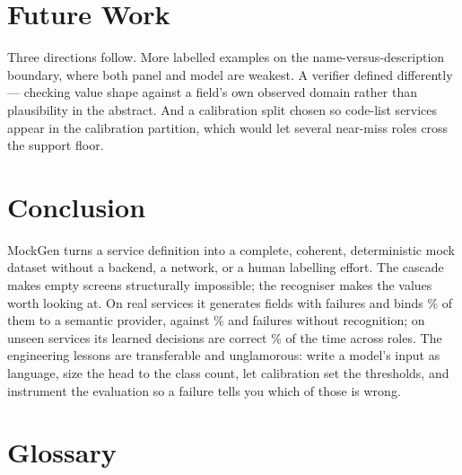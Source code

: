 \documentclass[journal]{IEEEtran}
\newcommand{\system}{MockGen}
\begin{document}
\section{Future Work}
\label{sec:future}

Three directions follow. More labelled examples on the
name-versus-description boundary, where both panel and model are
weakest. A verifier defined differently --- checking value shape against
a field's own observed domain rather than plausibility in the abstract.
And a calibration split chosen so code-list services appear in the
calibration partition, which would let several near-miss roles cross the
support floor.

\section{Conclusion}
\label{sec:conclusion}

\system{} turns a service definition into a complete, coherent,
deterministic mock dataset without a backend, a network, or a human
labelling effort. The cascade makes empty screens structurally
impossible; the recogniser makes the values worth looking at. On
\CorpusServices{} real services it generates \CorpusFields{} fields with
\CorpusFailed{} failures and binds \ProviderBoundPct\% of them to a
semantic provider, against \DetProviderBoundPct\% and \DetFailed{}
failures without recognition; on \SealedServices{} unseen services its
learned decisions are correct \SealedPrecision\% of the time across
\RoutableRoles{} roles. The engineering lessons are transferable and
unglamorous: write a model's input as language, size the head to the
class count, let calibration set the thresholds, and instrument the
evaluation so a failure tells you which of those is wrong.

\section*{Glossary}
\end{document}
